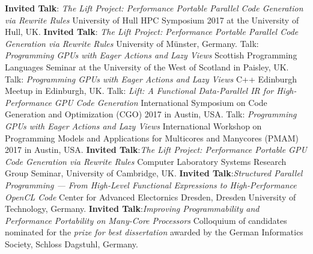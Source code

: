 \documentclass[11pt,a4paper]{moderncv}
\newcommand{\strong}[1]{\textcolor{color1}{\textbf{#1}}}
\begin{document}
         {\strong{Invited Talk}:\newline
          \emph{The Lift Project: Performance Portable Parallel Code Generation via Rewrite Rules}\newline
         \small University of Hull HPC Symposium 2017 at the University of Hull, UK.}
         {\strong{Invited Talk}:\newline
          \emph{The Lift Project: Performance Portable Parallel Code Generation via Rewrite Rules}\newline
         \small University of Münster, Germany.}
         {Talk: \emph{Programming GPUs with Eager Actions and Lazy Views}\newline
         \small Scottish Programming Languages Seminar at the University of the West of Scotland in Paisley, UK.}
         {Talk: \emph{Programming GPUs with Eager Actions and Lazy Views}\newline
         \small C++ Edinburgh Meetup in Edinburgh, UK.}
         {Talk: \emph{Lift: A Functional Data-Parallel IR for High-Performance GPU Code Generation}\newline
          \small International Symposium on Code Generation and Optimization (CGO) 2017 in Austin, USA.}
         {Talk: \emph{Programming GPUs with Eager Actions and Lazy Views}\newline
          \small  International Workshop on Programming Models and Applications for Multicores and Manycores (PMAM) 2017 in Austin, USA.}
         {\strong{Invited Talk}:\newline \emph{The Lift Project: Performance Portable GPU Code Generation via Rewrite Rules}\newline
         Computer Laboratory Systems Research Group Seminar, University of Cambridge, UK.
         }
         {\strong{Invited Talk}:\newline \emph{Structured Parallel Programming --- From High-Level Functional Expressions to High-Performance OpenCL Code}\newline
         Center for Advanced Electornics Dresden, Dresden University of Technology, Germany.
         }
         {\strong{Invited Talk}:\newline \emph{Improving Programmability and Performance Portability on Many-Core Processors}\newline
         \small Colloquium of candidates nominated for the \emph{prize for best dissertation} awarded by the German Informatics Society, Schloss Dagstuhl, Germany.}
\end{document}
